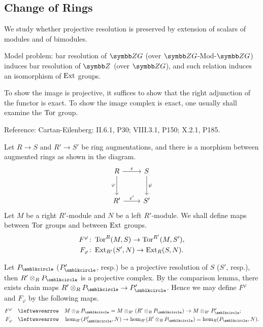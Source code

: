 \subsection{Change of Rings}

We study whether projective resolution is preserved by extension of scalars of modules and of bimodules.

Model problem: bar resolution of $\ZG$ (over $\ZG$-Mod-$\ZG$) induces bar resolution of $\ZZ$ (over $\ZG$), and such relation induces an isomorphism of $\operatorname{Ext}$ groups.

To show the image is projective, it suffices to show that the right adjunction of the functor is exact. To show the image complex is exact, one usually shall examine the $\operatorname{Tor}$ group.

Reference: Cartan-Eilenberg: II.6.1, P30; VIII.3.1, P150; X.2.1, P185.

Let $R\to S$ and $R'\to S'$ be ring augmentations, and there is a morphism between augmented rings as shown in the diagram.
\begin{equation*}
  \begin{tikzcd}[row sep=large]
    R & S\\
    R' & S'
    \arrow[from=1-1,]{1-2}[]{\varepsilon}
    \arrow[from=2-1,]{2-2}[]{\varepsilon'}
    \arrow[from=1-1,]{2-1}[swap,]{\varphi}
    \arrow[from=1-2,]{2-2}[]{\psi}
  \end{tikzcd}
\end{equation*}
Let $M$ be a right $R'$-module and $N$ be a left $R'$-module. We shall define maps between $\operatorname{Tor}$ groups and between $\operatorname{Ext}$ groups.
\begin{equation*}
  \begin{aligned}
    F^{\varphi}\colon&\operatorname{Tor}^R(M, S)\to\operatorname{Tor}^{R'}(M, S'),\\
    F_\varphi\colon&\operatorname{Ext}_{R'}(S', N)\to\operatorname{Ext}_{R}(S, N).
  \end{aligned}
\end{equation*}

Let $P_{\CCCIR}$ ($P_{\CCCIR}'$, resp.) be a projective resolution of $S$ ($S'$, resp.), then $R'\otimes_{R}P_{\CCCIR}$ is a projective complex. By the comparison lemma, there exists chain maps $R'\otimes_{R}P_{\CCCIR}\to P_{\CCCIR}'$. Hence we may define $F^\varphi$ and $F_\varphi$ by the following maps.
\begin{equation*}
  \begin{aligned}
    F^{\varphi}\quad\leftwavearrow\quad& M\otimes_R P_{\CCCIR}=M\otimes_{R'}(R'\otimes_{R}P_{\CCCIR})\to M\otimes_{R'}P_{\CCCIR}';\\
    F_{\varphi}\quad\leftwavearrow\quad& \HOM_{R'}(P_{\CCCIR}', N)\to\HOM_{R'}(R'\otimes_{R}P_{\CCCIR})=\HOM_{R}(P_{\CCCIR}, N).
  \end{aligned}
\end{equation*}

